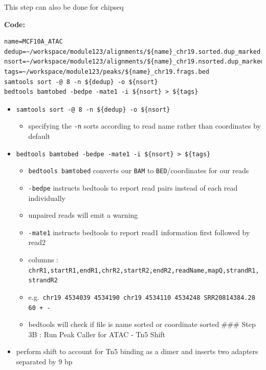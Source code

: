 \documentclass[
]{book}
\providecommand{\tightlist}{%
  \setlength{\itemsep}{0pt}\setlength{\parskip}{0pt}}
\begin{document}
This step can also be done for chipseq

\textbf{Code:}

\begin{verbatim}
name=MCF10A_ATAC
dedup=~/workspace/module123/alignments/${name}_chr19.sorted.dup_marked.dedup.bam
nsort=~/workspace/module123/alignments/${name}_chr19.nsorted.dup_marked.dedup.bam
tags=~/workspace/module123/peaks/${name}_chr19.frags.bed
samtools sort -@ 8 -n ${dedup} -o ${nsort}
bedtools bamtobed -bedpe -mate1 -i ${nsort} > ${tags}
\end{verbatim}

\begin{itemize}
\tightlist
\item
  \texttt{samtools\ sort\ -@\ 8\ -n\ \$\{dedup\}\ -o\ \$\{nsort\}}

  \begin{itemize}
  \tightlist
  \item
    specifying the \texttt{-n} sorts according to read name rather than coordinates by default
  \end{itemize}
\item
  \texttt{bedtools\ bamtobed\ -bedpe\ -mate1\ -i\ \$\{nsort\}\ \textgreater{}\ \$\{tags\}}

  \begin{itemize}
  \tightlist
  \item
    \texttt{bedtools\ bamtobed} converts our \texttt{BAM} to \texttt{BED}/coordinates for our reads
  \item
    \texttt{-bedpe} instructs bedtools to report read pairs instead of each read individually
  \item
    unpaired reads will emit a warning
  \item
    \texttt{-mate1} instructs bedtools to report read1 information first followed by read2
  \item
    columns : \texttt{chrR1,startR1,endR1,chrR2,startR2,endR2,readName,mapQ,strandR1,strandR2}
  \item
    e.g.~\texttt{chr19\ 4534039\ 4534190\ chr19\ 4534110\ 4534248\ SRR20814384.28\ 60\ +\ -}
  \item
    bedtools will check if file is name sorted or coordinate sorted
    \#\#\# Step 3B : Run Peak Caller for ATAC - Tn5 Shift
  \end{itemize}
\item
  perform shift to account for Tn5 binding as a dimer and inserts two adapters separated by 9 bp
\end{itemize}
\end{document}
